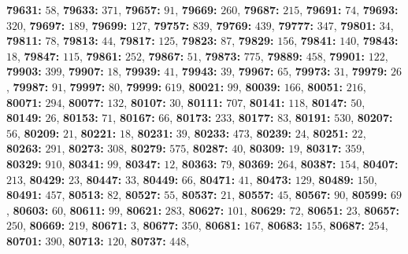 \textsf{\bfseries 79631:} $58$, \textsf{\bfseries 79633:} $371$, \textsf{\bfseries 79657:} $91$, \textsf{\bfseries 79669:} $260$, \textsf{\bfseries 79687:} $215$, \textsf{\bfseries 79691:} $74$, \textsf{\bfseries 79693:} $320$, \textsf{\bfseries 79697:} $189$, \textsf{\bfseries 79699:} $127$, \textsf{\bfseries 79757:} $839$, \textsf{\bfseries 79769:} $439$, \textsf{\bfseries 79777:} $347$, \textsf{\bfseries 79801:} $34$, \textsf{\bfseries 79811:} $78$, \textsf{\bfseries 79813:} $44$, \textsf{\bfseries 79817:} $125$, \textsf{\bfseries 79823:} $87$, \textsf{\bfseries 79829:} $156$, \textsf{\bfseries 79841:} $140$, \textsf{\bfseries 79843:} $18$, \textsf{\bfseries 79847:} $115$, \textsf{\bfseries 79861:} $252$, \textsf{\bfseries 79867:} $51$, \textsf{\bfseries 79873:} $775$, \textsf{\bfseries 79889:} $458$, \textsf{\bfseries 79901:} $122$, \textsf{\bfseries 79903:} $399$, \textsf{\bfseries 79907:} $18$, \textsf{\bfseries 79939:} $41$, \textsf{\bfseries 79943:} $39$, \textsf{\bfseries 79967:} $65$, \textsf{\bfseries 79973:} $31$, \textsf{\bfseries 79979:} $26$, \textsf{\bfseries 79987:} $91$, \textsf{\bfseries 79997:} $80$, \textsf{\bfseries 79999:} $619$, \textsf{\bfseries 80021:} $99$, \textsf{\bfseries 80039:} $166$, \textsf{\bfseries 80051:} $216$, \textsf{\bfseries 80071:} $294$, \textsf{\bfseries 80077:} $132$, \textsf{\bfseries 80107:} $30$, \textsf{\bfseries 80111:} $707$, \textsf{\bfseries 80141:} $118$, \textsf{\bfseries 80147:} $50$, \textsf{\bfseries 80149:} $26$, \textsf{\bfseries 80153:} $71$, \textsf{\bfseries 80167:} $66$, \textsf{\bfseries 80173:} $233$, \textsf{\bfseries 80177:} $83$, \textsf{\bfseries 80191:} $530$, \textsf{\bfseries 80207:} $56$, \textsf{\bfseries 80209:} $21$, \textsf{\bfseries 80221:} $18$, \textsf{\bfseries 80231:} $39$, \textsf{\bfseries 80233:} $473$, \textsf{\bfseries 80239:} $24$, \textsf{\bfseries 80251:} $22$, \textsf{\bfseries 80263:} $291$, \textsf{\bfseries 80273:} $308$, \textsf{\bfseries 80279:} $575$, \textsf{\bfseries 80287:} $40$, \textsf{\bfseries 80309:} $19$, \textsf{\bfseries 80317:} $359$, \textsf{\bfseries 80329:} $910$, \textsf{\bfseries 80341:} $99$, \textsf{\bfseries 80347:} $12$, \textsf{\bfseries 80363:} $79$, \textsf{\bfseries 80369:} $264$, \textsf{\bfseries 80387:} $154$, \textsf{\bfseries 80407:} $213$, \textsf{\bfseries 80429:} $23$, \textsf{\bfseries 80447:} $33$, \textsf{\bfseries 80449:} $66$, \textsf{\bfseries 80471:} $41$, \textsf{\bfseries 80473:} $129$, \textsf{\bfseries 80489:} $150$, \textsf{\bfseries 80491:} $457$, \textsf{\bfseries 80513:} $82$, \textsf{\bfseries 80527:} $55$, \textsf{\bfseries 80537:} $21$, \textsf{\bfseries 80557:} $45$, \textsf{\bfseries 80567:} $90$, \textsf{\bfseries 80599:} $69$, \textsf{\bfseries 80603:} $60$, \textsf{\bfseries 80611:} $99$, \textsf{\bfseries 80621:} $283$, \textsf{\bfseries 80627:} $101$, \textsf{\bfseries 80629:} $72$, \textsf{\bfseries 80651:} $23$, \textsf{\bfseries 80657:} $250$, \textsf{\bfseries 80669:} $219$, \textsf{\bfseries 80671:} $3$, \textsf{\bfseries 80677:} $350$, \textsf{\bfseries 80681:} $167$, \textsf{\bfseries 80683:} $155$, \textsf{\bfseries 80687:} $254$, \textsf{\bfseries 80701:} $390$, \textsf{\bfseries 80713:} $120$, \textsf{\bfseries 80737:} $448$, 
